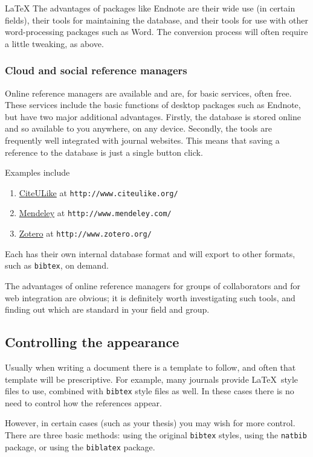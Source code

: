 \begin{chapter}{\LaTeX}
The advantages of packages like Endnote are their wide use (in certain fields), their tools for maintaining the database, and their tools for use with other word-processing packages such as Word. The conversion process will often require a little tweaking, as above.

\subsubsection{Cloud and social reference managers}
\label{sec:cloud}

Online reference managers are available and are, for basic services, often free. These services include the basic functions of desktop packages such as Endnote, but have two major additional advantages. Firstly, the database is stored online and so available to you anywhere, on any device. Secondly, the tools are frequently well integrated with journal websites. This means that saving a reference to the database is just a single button click.

Examples include
%
\begin{enumerate}
\item \href{http://www.citeulike.org/}{CiteULike} at \verb|http://www.citeulike.org/|
\item \href{http://www.mendeley.com/}{Mendeley} at \verb|http://www.mendeley.com/|
\item \href{http://www.zotero.org/}{Zotero} at \verb|http://www.zotero.org/|
\end{enumerate}
%
Each has their own internal database format and will export to other formats, such as \verb|bibtex|, on demand.

The advantages of online reference managers for groups of collaborators and for web integration are obvious; it is definitely worth investigating such tools, and finding out which are standard in your field and group.

\subsection{Controlling the appearance}
\label{sec:appearance}

Usually when writing a document there is a template to follow, and often that template will be prescriptive. For example, many journals provide \LaTeX\ style files to use, combined with \verb|bibtex| style files as well. In these cases there is no need to control how the references appear.

However, in certain cases (such as your thesis) you may wish for more control. There are three basic methods: using the original \verb|bibtex| styles, using the \verb|natbib| package, or using the \verb|biblatex| package.


\end{chapter}
